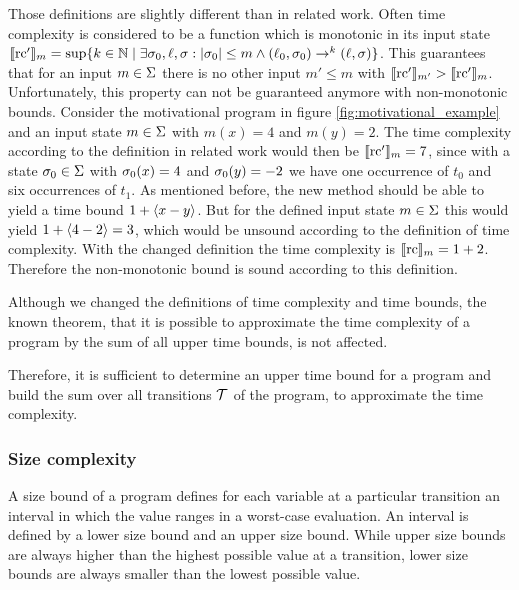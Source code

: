 Those definitions are slightly different than in related work. 
Often time complexity is considered to be a function which is monotonic in its input state $\llbracket \text{rc}' \rrbracket_{m} = \sup \lbrace  k \in \mathbb{N} \mid \exists \sigma_0, \ell, \sigma: \left|\sigma_0\right| \leq m \wedge (\ell_0, \sigma_0) \rightarrow^k (\ell, \sigma)  \rbrace$.
This guarantees that for an input $m \in \Sigma$ there is no other input $m' \leq m$ with $\llbracket \text{rc}' \rrbracket_{m'} > \llbracket \text{rc}' \rrbracket_{m}$.
Unfortunately, this property can not be guaranteed anymore with non-monotonic bounds.
Consider the motivational program in figure \ref{fig:motivational_example} and an input state $m \in \Sigma$ with $m(x) = 4$ and $m(y) = 2$.
The time complexity according to the definition in related work would then be $\llbracket \text{rc}' \rrbracket_{m} = 7$, since with a state $\sigma_0 \in \Sigma$ with $\sigma_0(x) = 4$ and $\sigma_0(y) = -2$ we have one occurrence of $t_0$ and six occurrences of $t_1$.
As mentioned before, the new method should be able to yield a time bound $1 + \langle x-y\rangle$.
But for the defined input state $m \in \Sigma$ this would yield $1 + \langle4-2\rangle = 3$, which would be unsound according to the definition of time complexity.
With the changed definition the time complexity is $\llbracket \text{rc} \rrbracket_{m} = 1 + 2$.
Therefore the non-monotonic bound is sound according to this definition.

Although we changed the definitions of time complexity and time bounds, the known theorem, that it is possible to approximate the time complexity of a program by the sum of all upper time bounds, is not affected.



Therefore, it is sufficient to determine an upper time bound for a program and build the sum over all transitions $\mathcal{T}$ of the program, to approximate the time complexity. 

\subsubsection{Size complexity}

A size bound of a program defines for each variable at a particular transition an interval in which the value ranges in a worst-case evaluation.
An interval is defined by a lower size bound and an upper size bound.
While upper size bounds are always higher than the highest possible value at a transition, lower size bounds are always smaller than the lowest possible value.

